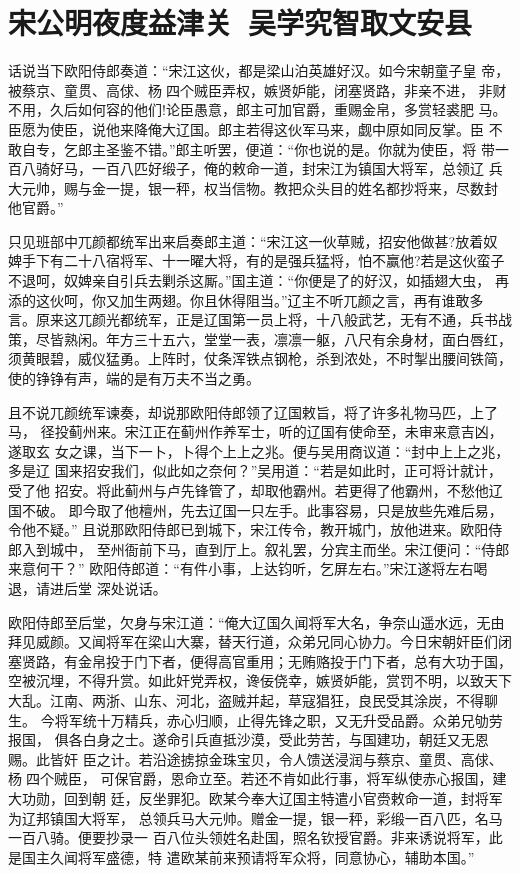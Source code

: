 \chapter{宋公明夜度益津关~吴学究智取文安县}

话说当下欧阳侍郎奏道：“宋江这伙，都是梁山泊英雄好汉。如今宋朝童子皇
帝，被蔡京、童贯、高俅、杨四个贼臣弄权，嫉贤妒能，闭塞贤路，非亲不进，
非财不用，久后如何容的他们!论臣愚意，郎主可加官爵，重赐金帛，多赏轻裘肥
马。臣愿为使臣，说他来降俺大辽国。郎主若得这伙军马来，觑中原如同反掌。臣
不敢自专，乞郎主圣鉴不错。”郎主听罢，便道：“你也说的是。你就为使臣，将
带一百八骑好马，一百八匹好缎子，俺的敕命一道，封宋江为镇国大将军，总领辽
兵大元帅，赐与金一提，银一秤，权当信物。教把众头目的姓名都抄将来，尽数封
他官爵。”

只见班部中兀颜都统军出来启奏郎主道：“宋江这一伙草贼，招安他做甚?放着奴
婢手下有二十八宿将军、十一曜大将，有的是强兵猛将，怕不赢他?若是这伙蛮子
不退呵，奴婢亲自引兵去剿杀这厮。”国主道：“你便是了的好汉，如插翅大虫，
再添的这伙呵，你又加生两翅。你且休得阻当。”辽主不听兀颜之言，再有谁敢多
言。原来这兀颜光都统军，正是辽国第一员上将，十八般武艺，无有不通，兵书战
策，尽皆熟闲。年方三十五六，堂堂一表，凛凛一躯，八尺有余身材，面白唇红，
须黄眼碧，威仪猛勇。上阵时，仗条浑铁点钢枪，杀到浓处，不时掣出腰间铁简，
使的铮铮有声，端的是有万夫不当之勇。

且不说兀颜统军谏奏，却说那欧阳侍郎领了辽国敕旨，将了许多礼物马匹，上了马，
径投蓟州来。宋江正在蓟州作养军士，听的辽国有使命至，未审来意吉凶，遂取玄
女之课，当下一卜，卜得个上上之兆。便与吴用商议道：“封中上上之兆，多是辽
国来招安我们，似此如之奈何？”吴用道：“若是如此时，正可将计就计，受了他
招安。将此蓟州与卢先锋管了，却取他霸州。若更得了他霸州，不愁他辽国不破。
即今取了他檀州，先去辽国一只左手。此事容易，只是放些先难后易，令他不疑。”
且说那欧阳侍郎已到城下，宋江传令，教开城门，放他进来。欧阳侍郎入到城中，
至州衙前下马，直到厅上。叙礼罢，分宾主而坐。宋江便问：“侍郎来意何干？”
欧阳侍郎道：“有件小事，上达钧听，乞屏左右。”宋江遂将左右喝退，请进后堂
深处说话。

欧阳侍郎至后堂，欠身与宋江道：“俺大辽国久闻将军大名，争奈山遥水远，无由
拜见威颜。又闻将军在梁山大寨，替天行道，众弟兄同心协力。今日宋朝奸臣们闭
塞贤路，有金帛投于门下者，便得高官重用；无贿赂投于门下者，总有大功于国，
空被沉埋，不得升赏。如此奸党弄权，谗佞侥幸，嫉贤妒能，赏罚不明，以致天下
大乱。江南、两浙、山东、河北，盗贼并起，草寇猖狂，良民受其涂炭，不得聊生。
今将军统十万精兵，赤心归顺，止得先锋之职，又无升受品爵。众弟兄劬劳报国，
俱各白身之士。遂命引兵直抵沙漠，受此劳苦，与国建功，朝廷又无恩赐。此皆奸
臣之计。若沿途掳掠金珠宝贝，令人馈送浸润与蔡京、童贯、高俅、杨四个贼臣，
可保官爵，恩命立至。若还不肯如此行事，将军纵使赤心报国，建大功勋，回到朝
廷，反坐罪犯。欧某今奉大辽国主特遣小官赍敕命一道，封将军为辽邦镇国大将军，
总领兵马大元帅。赠金一提，银一秤，彩缎一百八匹，名马一百八骑。便要抄录一
百八位头领姓名赴国，照名钦授官爵。非来诱说将军，此是国主久闻将军盛德，特
遣欧某前来预请将军众将，同意协心，辅助本国。”

